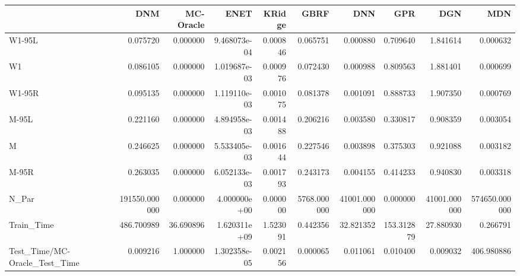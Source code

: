 \begin{tabular}{lrrrrrrrrr}
\toprule
{} &            DNM &  MC-Oracle &          ENET &    KRidge &         GBRF &           DNN &         GPR &           DGN &            MDN \\
\midrule
W1-95L                        &       0.075720 &   0.000000 &  9.468073e-04 &  0.000846 &     0.065751 &      0.000880 &    0.709640 &      1.841614 &       0.000632 \\
W1                            &       0.086105 &   0.000000 &  1.019687e-03 &  0.000976 &     0.072430 &      0.000988 &    0.809563 &      1.881401 &       0.000699 \\
W1-95R                        &       0.095135 &   0.000000 &  1.119110e-03 &  0.001075 &     0.081378 &      0.001091 &    0.888733 &      1.907350 &       0.000769 \\
M-95L                         &       0.221160 &   0.000000 &  4.894958e-03 &  0.001488 &     0.206216 &      0.003580 &    0.330817 &      0.908359 &       0.003054 \\
M                             &       0.246625 &   0.000000 &  5.533405e-03 &  0.001644 &     0.227546 &      0.003898 &    0.375303 &      0.921088 &       0.003182 \\
M-95R                         &       0.263035 &   0.000000 &  6.052133e-03 &  0.001793 &     0.243173 &      0.004155 &    0.414233 &      0.940830 &       0.003318 \\
N\_Par                         &  191550.000000 &   0.000000 &  4.000000e+00 &  0.000000 &  5768.000000 &  41001.000000 &    0.000000 &  41001.000000 &  574650.000000 \\
Train\_Time                    &     486.700989 &  36.690896 &  1.620311e+09 &  1.523091 &     0.442356 &     32.821352 &  153.312879 &     27.880930 &       0.266791 \\
Test\_Time/MC-Oracle\_Test\_Time &       0.009216 &   1.000000 &  1.302358e-05 &  0.002156 &     0.000065 &      0.011061 &    0.010400 &      0.009032 &     406.980886 \\
\bottomrule
\end{tabular}
